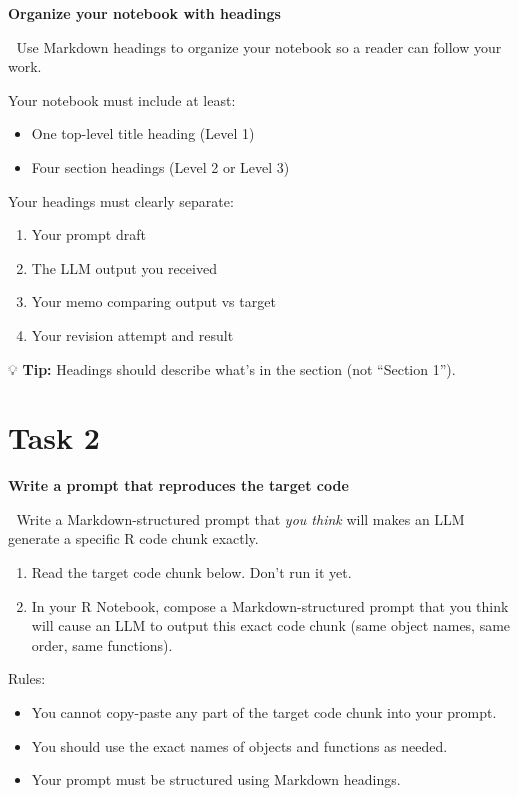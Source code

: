 \documentclass[
  12pt,
]{scrreprt}
\begin{document}
\textbf{Organize your notebook with headings}

🎯 Use Markdown headings to organize your notebook so a reader can
follow your work.

Your notebook must include at least:

\begin{itemize}
\item
  One top-level title heading (Level 1)
\item
  Four section headings (Level 2 or Level 3)
\end{itemize}

Your headings must clearly separate:

\begin{enumerate}
\def\labelenumi{\arabic{enumi}.}
\item
  Your prompt draft
\item
  The LLM output you received
\item
  Your memo comparing output vs target
\item
  Your revision attempt and result
\end{enumerate}

💡 \textbf{Tip:} Headings should describe what's in the section (not
``Section 1'').

\section{Task 2}\label{task-2}

\textbf{Write a prompt that reproduces the target code}

🎯 Write a Markdown-structured prompt that \emph{you think} will makes
an LLM generate a specific R code chunk exactly.

\begin{enumerate}
\def\labelenumi{\arabic{enumi}.}
\item
  Read the target code chunk below. Don't run it yet.
\item
  In your R Notebook, compose a Markdown-structured prompt that you
  think will cause an LLM to output this exact code chunk (same object
  names, same order, same functions).
\end{enumerate}

Rules:

\begin{itemize}
\item
  You cannot copy-paste any part of the target code chunk into your
  prompt.
\item
  You should use the exact names of objects and functions as needed.
\item
  Your prompt must be structured using Markdown headings.
\end{itemize}
\end{document}
